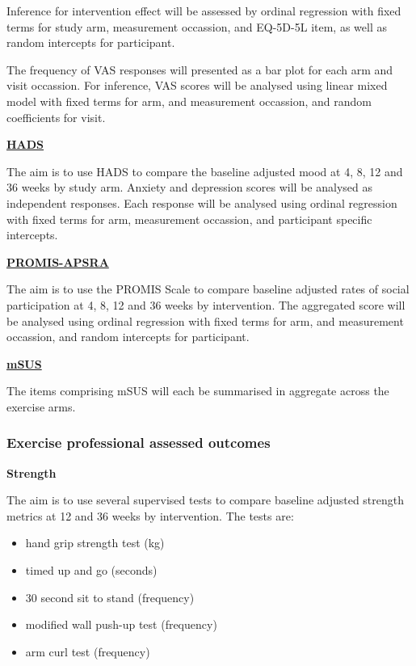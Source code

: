 \documentclass[11pt,parskip=half-]{scrartcl}
\providecommand{\tightlist}{%
  \setlength{\itemsep}{0pt}\setlength{\parskip}{0pt}}
\begin{document}
Inference for intervention effect will be assessed by ordinal regression with fixed terms for study arm, measurement occassion, and EQ-5D-5L item, as well as random intercepts for participant.

The frequency of VAS responses will presented as a bar plot for each arm and visit occassion. For inference, VAS scores will be analysed using linear mixed model with fixed terms for arm, and measurement occassion, and random coefficients for visit.


\label{analysis:hads}
\hyperref[outcome:hads]{\textbf{HADS}}

The aim is to use HADS to compare the baseline adjusted mood at 4, 8, 12 and 36 weeks by study arm. Anxiety and depression scores will be analysed as independent responses. Each response will be analysed using ordinal regression with fixed terms for arm, measurement occassion, and participant specific intercepts.

\label{analysis:promis-aspra}
\hyperref[outcome:promis-apsra]{\textbf{PROMIS-APSRA}}

The aim is to use the PROMIS Scale to compare baseline adjusted rates of social participation at 4, 8, 12 and 36 weeks by intervention. The aggregated score will be analysed using ordinal regression with fixed terms for arm, and measurement occassion, and random intercepts for participant.

\label{analysis:msus}
\hyperref[outcome:msus]{\textbf{mSUS}}

The items comprising mSUS will each be summarised in aggregate across the exercise arms.


\subsubsection{Exercise professional assessed outcomes}\label{exercise-professional-assessed-outcomes}

\textbf{Strength}

The aim is to use several supervised tests to compare baseline adjusted strength metrics at 12 and 36 weeks by intervention. The tests are:

\begin{itemize}
  \tightlist
  \item hand grip strength test (kg)
  \item timed up and go (seconds)
  \item 30 second sit to stand (frequency)
  \item modified wall push-up test (frequency)
  \item arm curl test (frequency)

\end{itemize}
\end{document}
